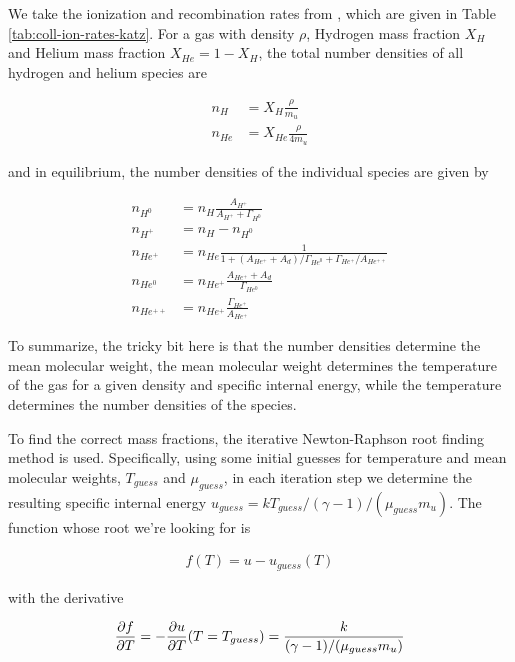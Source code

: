 We take the ionization and recombination rates from \citet{katzCosmologicalSimulationsTreeSPH1996},
which are given in Table \ref{tab:coll-ion-rates-katz}. For a gas with density $\rho$, Hydrogen
mass fraction $X_H$ and Helium mass fraction $X_{He} = 1 - X_H$, the total number densities of all
hydrogen and helium species are

\begin{align}
  n_H &= X_H \frac{\rho}{m_u} \\
  n_{He} &= X_{He}  \frac{\rho}{4 m_u}
\end{align}

and in equilibrium, the number densities of the individual species are given by

\begin{align}
    n_{H^0} &=
        n_H \frac{A_{H^+}}{A_{H^+} + \Gamma_{H^0}} \\
    n_{H^+} &=
        n_H - n_{H^0} \\
    n_{He^+} &=
        n_{He} \frac{1}{1 + (A_{He^+} + A_d) / \Gamma_{He^0} + \Gamma_{He^+} / A_{He^{++}}} \\
    n_{He^0} &=
        n_{He^+} \frac{A_{He^+} + A_d}{\Gamma_{He^0}} \\
    n_{He^{++}} &=
        n_{He^+} \frac{\Gamma_{He^+}}{A_{He^+}}
\end{align}


To summarize, the tricky bit here is that the number densities determine the mean molecular weight,
the mean molecular weight determines the temperature of the gas for a given density and specific
internal energy, while the temperature determines the number densities of the species.

To find the correct mass fractions, the iterative Newton-Raphson root finding method is used.
Specifically, using some initial guesses for temperature and mean molecular weights, $T_{guess}$
and $\mu_{guess}$, in each iteration step we determine the resulting specific internal energy
$u_{guess} = k T_{guess} / (\gamma - 1) / (\mu_{guess} m_u)$. The function whose root we're looking
for is

\begin{align}
  f(T) = u - u_{guess}(T)
\end{align}

with the derivative

\begin{align}
  \frac{\partial f}{\partial T} =  - \frac{\partial u}{\partial T} (T = T_{guess}) = \frac{k}{(\gamma -
1) / (\mu_{guess} m_u )}
\end{align}

